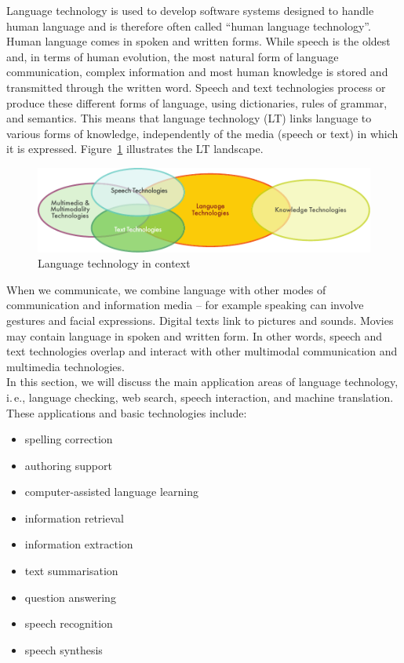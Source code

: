 \documentclass[]{../metanetpaper}
\begin{document}
\begin{multicols}{2}

Language technology is used to develop software systems designed to handle human language and is therefore often called “human language technology”. Human language comes in spoken and written forms. While speech is the oldest and, in terms of human evolution, the most natural form of language communication, complex information and most human knowledge is stored and transmitted through the written word. Speech and text technologies process or produce these different forms of language, using dictionaries, rules of grammar, and semantics. This means that language technology (LT) links language to various forms of knowledge, independently of the media (speech or text) in which it is expressed. Figure~\ref{fig:ltincontext_en} illustrates the LT landscape.

\begin{figure}[htb]
  \center
  \includegraphics[width=\textwidth]{../_media/english/language_technologies}
  \caption{Language technology in context}
  \label{fig:ltincontext_en}
\end{figure}

When we communicate, we combine language with other modes of communication and information media – for example speaking can involve gestures and facial expressions. Digital texts link to pictures and sounds. Movies may contain language in spoken and written form. In other words, speech and text technologies overlap and interact with other multimodal communication and multimedia technologies.\\ 
In this section, we will discuss the main application areas of language technology, i.\,e., language checking, web search, speech interaction, and machine translation. These applications and basic technologies include:

\begin{itemize}
\item spelling correction
\item authoring support
\item computer-assisted language learning
\item information retrieval 
\item information extraction
\item text summarisation
\item question answering
\item speech recognition 
\item speech synthesis 
\end{itemize}


\end{multicols}
\end{document}
